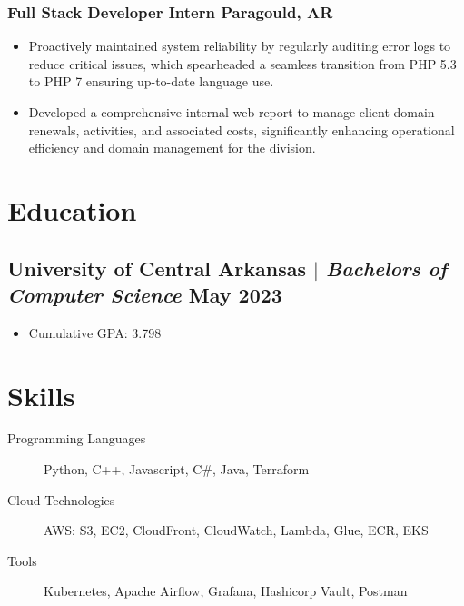 \documentclass[10pt]{article}
\begin{document}
\subsubsection{Full Stack Developer Intern \hfill Paragould, AR}
\begin{itemize}
    \item Proactively maintained system reliability by regularly auditing error logs to reduce critical issues, which spearheaded a seamless transition from PHP 5.3 to PHP 7 ensuring up-to-date language use.
    \\ %
    \item Developed a comprehensive internal web report to manage client domain renewals, activities, and associated costs, significantly enhancing operational efficiency and domain management for the division.
\end{itemize}

\section{Education}
\subsection{University of Central Arkansas $|$ {\normalfont\textit{Bachelors of Computer Science}} \hfill May 2023}
\begin{itemize}
    \item Cumulative GPA: 3.798
\end{itemize}

\section{Skills}
\begin{description}
    \item[Programming Languages] Python, C++, Javascript, C\#, Java, Terraform 
    \item[Cloud Technologies] AWS: S3, EC2, CloudFront, CloudWatch, Lambda, Glue, ECR, EKS
    \item[Tools] Kubernetes, Apache Airflow, Grafana, Hashicorp Vault, Postman
\end{description}
\end{document}
